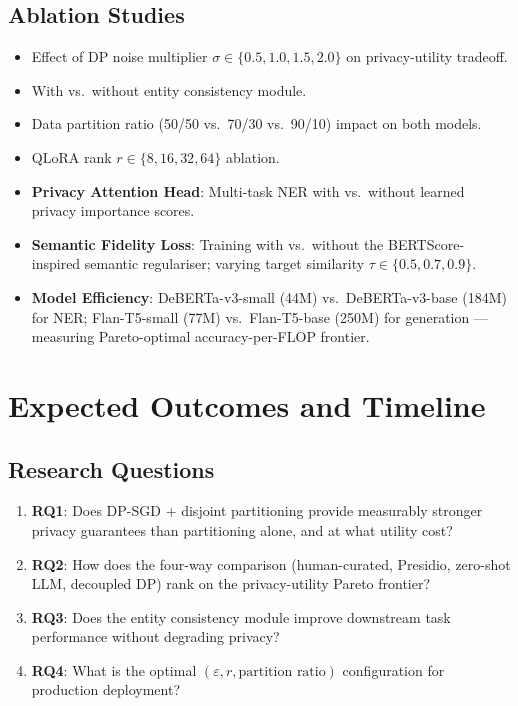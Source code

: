 \documentclass[9pt]{article}
\begin{document}
\subsection{Ablation Studies}
\begin{itemize}
    \item Effect of DP noise multiplier $\sigma \in \{0.5, 1.0, 1.5, 2.0\}$ on privacy-utility tradeoff.
    \item With vs.\ without entity consistency module.
    \item Data partition ratio (50/50 vs.\ 70/30 vs.\ 90/10) impact on both models.
    \item QLoRA rank $r \in \{8, 16, 32, 64\}$ ablation.
    \item \textbf{Privacy Attention Head}: Multi-task NER with vs.\ without learned privacy importance scores.
    \item \textbf{Semantic Fidelity Loss}: Training with vs.\ without the BERTScore-inspired semantic regulariser; varying target similarity $\tau \in \{0.5, 0.7, 0.9\}$.
    \item \textbf{Model Efficiency}: DeBERTa-v3-small (44M) vs.\ DeBERTa-v3-base (184M) for NER; Flan-T5-small (77M) vs.\ Flan-T5-base (250M) for generation --- measuring Pareto-optimal accuracy-per-FLOP frontier.
\end{itemize}

\section{Expected Outcomes and Timeline}

\subsection{Research Questions}
\begin{enumerate}
    \item \textbf{RQ1}: Does DP-SGD + disjoint partitioning provide measurably stronger privacy guarantees than partitioning alone, and at what utility cost?
    \item \textbf{RQ2}: How does the four-way comparison (human-curated, Presidio, zero-shot LLM, decoupled DP) rank on the privacy-utility Pareto frontier?
    \item \textbf{RQ3}: Does the entity consistency module improve downstream task performance without degrading privacy?
    \item \textbf{RQ4}: What is the optimal $(\varepsilon, r, \text{partition ratio})$ configuration for production deployment?
\end{enumerate}
\end{document}
